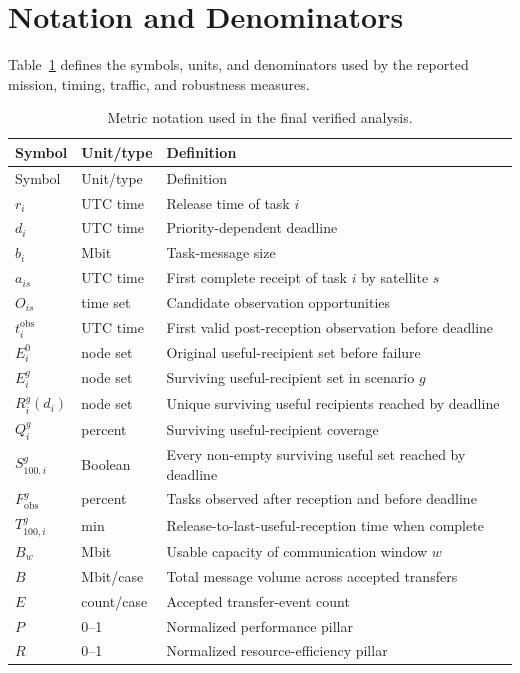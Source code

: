 \section{Notation and Denominators}

Table~\ref{tab:notation} defines the symbols, units, and denominators used by the reported mission, timing, traffic, and robustness measures.

\begin{longtable}{p{}p{}p{}}
\caption{Metric notation used in the final verified analysis.}\label{tab:notation}\\
\toprule
Symbol & Unit/type & Definition \\
\midrule
\endfirsthead
\toprule
Symbol & Unit/type & Definition \\
\midrule
\endhead
$r_i$ & UTC time & Release time of task $i$ \\
$d_i$ & UTC time & Priority-dependent deadline \\
$b_i$ & Mbit & Task-message size \\
$a_{is}$ & UTC time & First complete receipt of task $i$ by satellite $s$ \\
$O_{is}$ & time set & Candidate observation opportunities \\
$t_i^{\mathrm{obs}}$ & UTC time & First valid post-reception observation before deadline \\
$E_i^{0}$ & node set & Original useful-recipient set before failure \\
$E_i^{g}$ & node set & Surviving useful-recipient set in scenario $g$ \\
$R_i^g(d_i)$ & node set & Unique surviving useful recipients reached by deadline \\
$Q_i^g$ & percent & Surviving useful-recipient coverage \\
$S_{100,i}^{g}$ & Boolean & Every non-empty surviving useful set reached by deadline \\
$F_{\mathrm{obs}}^g$ & percent & Tasks observed after reception and before deadline \\
$T_{100,i}^{g}$ & min & Release-to-last-useful-reception time when complete \\
$B_w$ & Mbit & Usable capacity of communication window $w$ \\
$B$ & Mbit/case & Total message volume across accepted transfers \\
$E$ & count/case & Accepted transfer-event count \\
$P$ & 0--1 & Normalized performance pillar \\
$R$ & 0--1 & Normalized resource-efficiency pillar \\
\bottomrule
\end{longtable}

